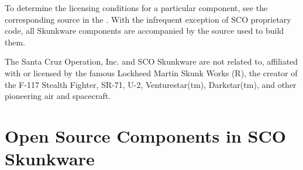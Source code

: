 \documentclass[letterpaper]{article}
\begin{document}
To determine the licensing conditions for a particular component, see the
corresponding source in the . With the infrequent exception of SCO proprietary 
code, all Skunkware components are accompanied by the source used to build them.

The Santa Cruz Operation, Inc. and SCO Skunkware are not
related to, affiliated with or licensed by the famous Lockheed
Martin Skunk Works (R), the creator of the F-117 Stealth Fighter,
SR-71, U-2, Venturestar(tm), Darkstar(tm), and other pioneering
air and spacecraft.




\section{Open Source Components in SCO Skunkware}
\end{document}
